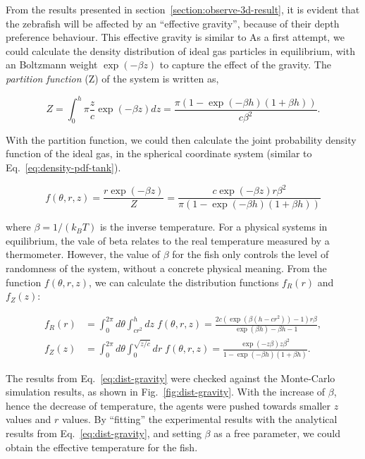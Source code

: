 \documentclass[11pt,twoside]{report}
\begin{document}
From the results presented in section~\ref{section:observe-3d-result}, it is evident that the zebrafish will be affected by an ``effective gravity'', because of their depth preference behaviour.
This effective gravity is similar to 
As a first attempt, we could calculate the density distribution of ideal gas particles in equilibrium, with an Boltzmann weight $\exp(-\beta z)$ to capture the effect of the gravity.
The \emph{partition function} (\gls{Z}) of the system is written as,

\begin{equation*}
	Z = \int_0^h \pi \frac{z}{c} \exp(-\beta z) dz
      = \frac{\pi (1 - \exp(-\beta h) (1 + \beta h))}{c \beta^2}.
\end{equation*}

\noindent With the partition function, we could then calculate the joint probability density function of the ideal gas, in the spherical coordinate system (similar to Eq.~\ref{eq:density-pdf-tank}).

\begin{equation}
	f(\theta, r, z)
	= \frac{r \exp(-\beta z)}{Z}
	= \frac{c \exp(-\beta z) r \beta^2}
	{\pi(1 - \exp(-\beta h)(1 + \beta h))}
\label{eq:density-pdf-gravity}
\end{equation}

\noindent where $\beta = 1 / (k_B T)$ is the inverse temperature. For a physical systems in equilibrium, the vale of \gls{beta} relates to the real temperature measured by a thermometer. However, the value of $\beta$ for the fish only controls the level of randomness of the system, without a concrete physical meaning. From the function $f(\theta, r, z)$, we can calculate the distribution functions $f_R(r)$ and $f_Z(z)$:

\begin{equation}
\begin{split}
	f_R(r) &= \int_0^{2\pi}{d \theta} \int_{cr^2}^{h}{dz} \; f(\theta, r, z)
		= \frac{
			2 c \left(
					\exp \left( \beta (h - c r^2) \right) - 1
				\right) r \beta
		}{
			\exp(\beta h) - \beta h - 1
		}, \\[2em]
	f_Z(z) &= \int_0^{2\pi}{d \theta} \int_0^{\sqrt{z/c}}{dr} \; f(\theta, r, z) 
	= \frac{\exp(-z \beta) z \beta^2}{
		1 - \exp(-\beta h) (1 + \beta h)
	}.
\end{split}
\label{eq:dist-gravity}
\end{equation}

\noindent The results from Eq.~\ref{eq:dist-gravity} were checked against the Monte-Carlo simulation results, as shown in Fig.~\ref{fig:dist-gravity}. With the increase of $\beta$, hence the decrease of temperature, the agents were pushed towards smaller $z$ values and $r$ values. By ``fitting'' the experimental results with the analytical results from Eq.~\ref{eq:dist-gravity}, and setting $\beta$ as a free parameter, we could obtain the effective temperature for the fish.
\end{document}
